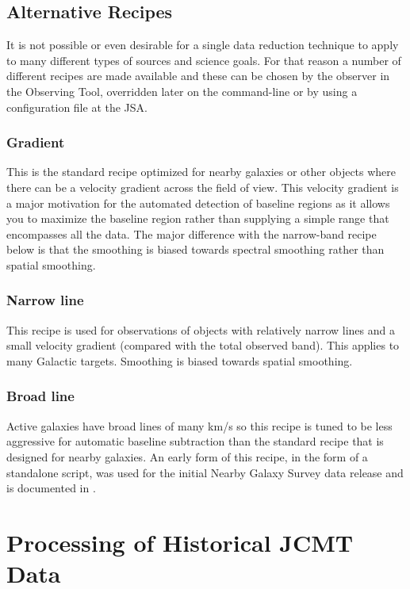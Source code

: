 \documentclass[final,authoryear,5p,times,twocolumn]{elsarticle}
\begin{document}
\subsection{Alternative Recipes}

It is not possible or even desirable for a single data reduction
technique to apply to many different types of sources and science
goals. For that reason a number of different recipes are made
available and these can be chosen by the observer in the Observing
Tool, overridden later on the command-line or by using a
configuration file at the JSA.

\subsubsection{Gradient}

This is the standard recipe optimized for nearby galaxies or other
objects where there can be a velocity gradient across
the field of view. This velocity gradient is a major motivation for the
automated detection of baseline regions as it allows you to maximize
the baseline region rather than supplying a simple range that
encompasses all the data. The major difference with the narrow-band
recipe below is that the smoothing is biased towards spectral smoothing
rather than spatial smoothing.

\subsubsection{Narrow line}

This recipe is used for observations of objects with relatively narrow
lines and a small velocity gradient (compared with the total observed
band). This applies to many Galactic targets. Smoothing is biased
towards spatial smoothing.

\subsubsection{Broad line}

Active galaxies have broad lines of many km/s so this recipe is tuned
to be less aggressive for automatic baseline subtraction than the
standard recipe that is designed for nearby galaxies. An early
form of this recipe, in the form of a standalone script, was used for
the initial Nearby Galaxy Survey data release and is documented in
\citet{2010ApJ...714..571W}.

\section{Processing of Historical JCMT Data}
\end{document}
